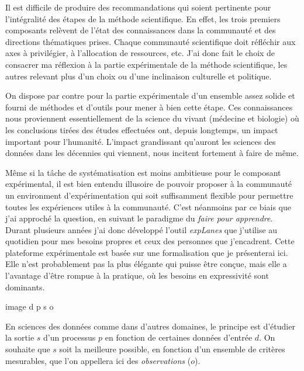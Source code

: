 Il est difficile de produire des recommandations qui soient pertinente pour l'intégralité des étapes de la méthode scientifique. En effet, les trois premiers composants relèvent de l'état des connaissances dans la communauté et des \og directions \fg thématiques prises. Chaque communauté scientifique doit réfléchir aux axes à privilégier, à l'allocation de ressources, etc. J'ai donc fait le choix de consacrer ma réflexion à la partie expérimentale de la méthode scientifique, les autres relevant plus d'un choix ou d'une inclinaison culturelle et politique.

On dispose par contre pour la partie expérimentale d'un ensemble assez solide et fourni de méthodes et d'outils pour mener à bien cette étape. Ces connaissances nous proviennent essentiellement de la science du vivant (médecine et biologie) où les conclusions tirées des études effectuées ont, depuis longtemps, un impact important pour l'humanité. L'impact grandissant qu'auront les sciences des données dans les décennies qui viennent, nous incitent fortement à faire de même.


Même si la tâche de systématisation est moins ambitieuse pour le composant expérimental, il est bien entendu illusoire de pouvoir proposer à la communauté un environment d'expérimentation qui soit suffisamment flexible pour permettre toutes les expériences utiles à la communauté. C'est néanmoins par ce biais que j'ai approché la question, en suivant le paradigme du \textsl{faire pour apprendre}. Durant plusieurs années j'ai donc développé l'outil \textsl{expLanes} que j'utilise au quotidien pour mes besoins propres et ceux des personnes que j'encadrent. Cette plateforme expérimentale est basée sur une formalisation que je présenterai ici. Elle n'est probablement pas la plus élégante qui puisse être conçue, mais elle a l'avantage d'être rompue à la pratique, où les besoins en expressivité sont dominants.


image d p s
        o

En sciences des données comme dans d'autres domaines, le principe est d'étudier la sortie $s$ d'un processus $p$ en fonction de certaines données d'entrée $d$. On souhaite que $s$ soit la meilleure possible, en fonction d'un ensemble de critères mesurables, que l'on appellera ici des \textsl{observations} ($o$).

